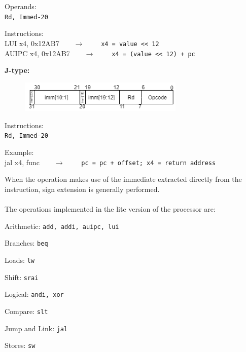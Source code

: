 \begin{description}
\begin{figure}[h]
  \end{figure}
	\begin{description}
		\item Operands:\\
		\texttt{Rd, Immed-20}
		\item Instructions:\\
		\textsf{LUI x4, 0x12AB7}\ \ \ \ $\longrightarrow$ \ \ \ \ \texttt{x4 = value << 12}\\
		\textsf{AUIPC x4, 0x12AB7}\ \ \ \ $\longrightarrow$ \ \ \ \ \texttt{x4 = (value << 12) + pc}
	\end{description}
	\item \textbf{J-type:}
  \begin{figure}[h]
    \center
    \includegraphics[width=0.7\textwidth]{sec1/images/Jtype.png}
  \end{figure}
	\begin{description}
		\item Instructions:\\
		\texttt{Rd, Immed-20}
		\item Example:\\
		\textsf{jal x4, func}\ \ \ \ $\longrightarrow$ \ \ \ \ \texttt{pc = pc + offset; x4 = return address}
	\end{description}
\end{description}
When the operation makes use of the immediate extracted directly from the instruction, sign extension is generally performed.\\ \\
The operations implemented in the lite version of the processor are:
\begin{description}
	\item Arithmetic:
	\texttt{add, addi, auipc, lui}
	\item Branches:
	\texttt{beq}
	\item Loads:
	\texttt{lw}
	\item Shift:
	\texttt{srai}
	\item Logical:
	\texttt{andi, xor}
	\item Compare:
	\texttt{slt}
	\item Jump and Link:
	\texttt{jal}
	\item Stores:
	\texttt{sw}
\end{description}
